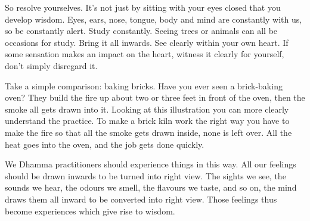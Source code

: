So resolve yourselves. It's not just by sitting with your eyes closed that you develop wisdom. Eyes, ears, nose, tongue, body and mind are constantly with us, so be constantly alert. Study constantly. Seeing trees or animals can all be occasions for study. Bring it all inwards. See clearly within your own heart. If some sensation makes an impact on the heart, witness it clearly for yourself, don't simply disregard it. 

Take a simple comparison: baking bricks. Have you ever seen a brick-baking oven? They build the fire up about two or three feet in front of the oven, then the smoke all gets drawn into it. Looking at this illustration you can more clearly understand the practice. To make a brick kiln work the right way you have to make the fire so that all the smoke gets drawn inside, none is left over. All the heat goes into the oven, and the job gets done quickly. 

We Dhamma practitioners should experience things in this way. All our feelings should be drawn inwards to be turned into right view. The sights we see, the sounds we hear, the odours we smell, the flavours we taste, and so on, the mind draws them all inward to be converted into right view. Those feelings thus become experiences which give rise to wisdom. 
